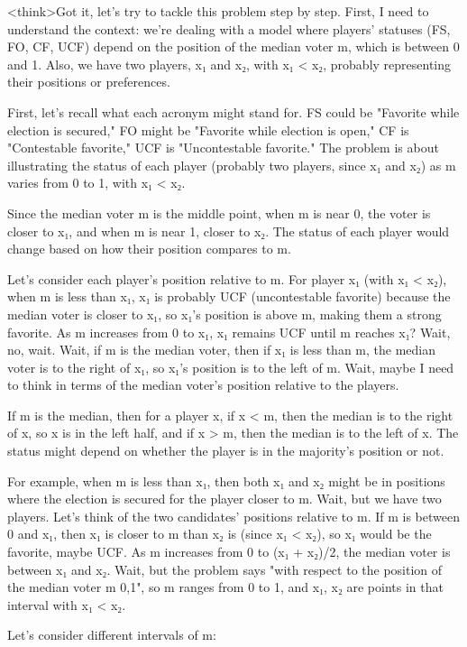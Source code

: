 <think>Got it, let's try to tackle this problem step by step. First, I need to understand the context: we're dealing with a model where players' statuses (FS, FO, CF, UCF) depend on the position of the median voter m, which is between 0 and 1. Also, we have two players, x₁ and x₂, with x₁ < x₂, probably representing their positions or preferences. 

First, let's recall what each acronym might stand for. FS could be "Favorite while election is secured," FO might be "Favorite while election is open," CF is "Contestable favorite," UCF is "Uncontestable favorite." The problem is about illustrating the status of each player (probably two players, since x₁ and x₂) as m varies from 0 to 1, with x₁ < x₂. 

Since the median voter m is the middle point, when m is near 0, the voter is closer to x₁, and when m is near 1, closer to x₂. The status of each player would change based on how their position compares to m. 

Let's consider each player's position relative to m. For player x₁ (with x₁ < x₂), when m is less than x₁, x₁ is probably UCF (uncontestable favorite) because the median voter is closer to x₁, so x₁'s position is above m, making them a strong favorite. As m increases from 0 to x₁, x₁ remains UCF until m reaches x₁? Wait, no, wait. Wait, if m is the median voter, then if x₁ is less than m, the median voter is to the right of x₁, so x₁'s position is to the left of m. Wait, maybe I need to think in terms of the median voter's position relative to the players. 

If m is the median, then for a player x, if x < m, then the median is to the right of x, so x is in the left half, and if x > m, then the median is to the left of x. The status might depend on whether the player is in the majority's position or not. 

For example, when m is less than x₁, then both x₁ and x₂ might be in positions where the election is secured for the player closer to m. Wait, but we have two players. Let's think of the two candidates' positions relative to m. If m is between 0 and x₁, then x₁ is closer to m than x₂ is (since x₁ < x₂), so x₁ would be the favorite, maybe UCF. As m increases from 0 to (x₁ + x₂)/2, the median voter is between x₁ and x₂. Wait, but the problem says "with respect to the position of the median voter m 0,1", so m ranges from 0 to 1, and x₁, x₂ are points in that interval with x₁ < x₂. 

Let's consider different intervals of m:

